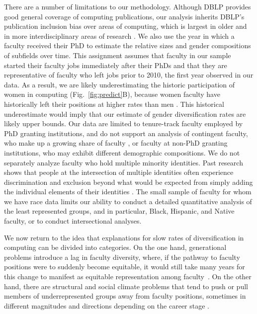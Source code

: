 \documentclass[reprint, twocolumn, aps, nofootinbib, superscriptaddress, longbibliography]{revtex4-1}
\begin{document}
There are a number of limitations to our methodology. Although DBLP provides good general coverage of computing publications, our analysis inherits DBLP's publication inclusion bias over areas of computing, which is largest in older and in more interdisciplinary areas of research \cite{way2017misleading}. We also use the year in which a faculty received their PhD to estimate the relative sizes and gender compositions of subfields over time. This assignment assumes that faculty in our sample started their faculty jobs immediately after their PhDs and that they are representative of faculty who left jobs prior to 2010, the first year observed in our data. As a result, we are likely underestimating the historic participation of women in computing (Fig.~\ref{fig:predict}B), because women faculty have historically left their positions at higher rates than men \cite{pell1996fixing, clark2005women, cech2019changing}. This historical underestimate would imply that our estimate of gender diversification rates are likely upper bounds. Our data are limited to tenure-track faculty employed by PhD granting institutions, and do not support an analysis of contingent faculty, who make up a growing share of faculty \cite{mcnaughtan2017understanding, finley2009women} , or faculty at non-PhD granting institutions, who may exhibit different demographic compositions. We do not separately analyze faculty who hold multiple minority identities. Past research shows that people at the intersection of multiple identities often experience discrimination and exclusion beyond what would be expected from simply adding the individual elements of their identities \cite{crenshaw1989demarginalizing}. The small sample of faculty for whom we have race data limits our ability to conduct a detailed quantitative analysis of the least represented groups, and in particular, Black, Hispanic, and Native faculty, or to conduct intersectional analyses. 

We now return to the idea that explanations for slow rates of diversification in computing can be divided into categories. On the one hand, generational problems introduce a lag in faculty diversity, where, if the pathway to faculty positions were to suddenly become equitable, it would still take many years for this change to manifest as equitable representation among faculty~\cite{hargens2002demographic, marschke2007demographic}. On the other hand, there are structural and social climate problems that tend to push or pull members of underrepresented groups away from faculty positions, sometimes in different magnitudes and directions depending on the career stage \cite{adya2005early}. 
\end{document}
